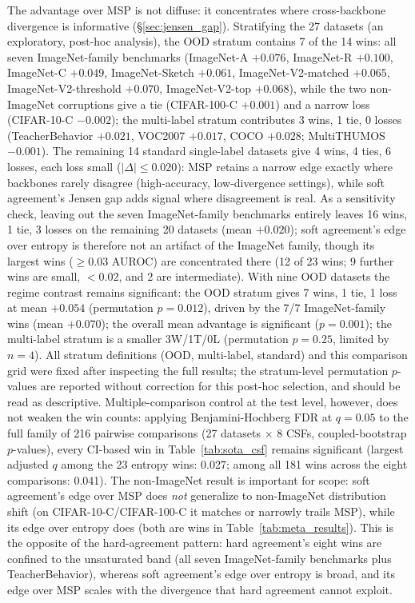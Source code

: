\documentclass[a4paper,fleqn]{cas-sc}
\begin{document}
The advantage over MSP is not diffuse: it concentrates where cross-backbone divergence is informative (\S\ref{sec:jensen_gap}).
Stratifying the 27 datasets (an exploratory, post-hoc analysis), the OOD stratum contains 7 of the 14 wins: all seven ImageNet-family benchmarks (ImageNet-A $+0.076$, ImageNet-R $+0.100$, ImageNet-C $+0.049$, ImageNet-Sketch $+0.061$, ImageNet-V2-matched $+0.065$, ImageNet-V2-threshold $+0.070$, ImageNet-V2-top $+0.068$), while the two non-ImageNet corruptions give a tie (CIFAR-100-C $+0.001$) and a narrow loss (CIFAR-10-C $-0.002$); the multi-label stratum contributes 3 wins, 1 tie, 0 losses (TeacherBehavior $+0.021$, VOC2007 $+0.017$, COCO $+0.028$; MultiTHUMOS $-0.001$).
The remaining 14 standard single-label datasets give 4 wins, 4 ties, 6 losses, each loss small ($|\Delta| \le 0.020$): MSP retains a narrow edge exactly where backbones rarely disagree (high-accuracy, low-divergence settings), while soft agreement's Jensen gap adds signal where disagreement is real.
As a sensitivity check, leaving out the seven ImageNet-family benchmarks entirely leaves 16 wins, 1 tie, 3 losses on the remaining 20 datasets (mean $+0.020$); soft agreement's edge over entropy is therefore not an artifact of the ImageNet family, though its largest wins ($\ge 0.03$ AUROC) are concentrated there (12 of 23 wins; 9 further wins are small, $< 0.02$, and 2 are intermediate).
With nine OOD datasets the regime contrast remains significant: the OOD stratum gives 7 wins, 1 tie, 1 loss at mean $+0.054$ (permutation $p = 0.012$), driven by the 7/7 ImageNet-family wins (mean $+0.070$); the overall mean advantage is significant ($p = 0.001$); the multi-label stratum is a smaller 3W/1T/0L (permutation $p = 0.25$, limited by $n{=}4$).
All stratum definitions (OOD, multi-label, standard) and this comparison grid were fixed after inspecting the full results; the stratum-level permutation $p$-values are reported without correction for this post-hoc selection, and should be read as descriptive.
Multiple-comparison control at the test level, however, does not weaken the win counts: applying Benjamini-Hochberg FDR at $q{=}0.05$ to the full family of 216 pairwise comparisons (27 datasets $\times$ 8 CSFs, coupled-bootstrap $p$-values), every CI-based win in Table~\ref{tab:sota_csf} remains significant (largest adjusted $q$ among the 23 entropy wins: 0.027; among all 181 wins across the eight comparisons: 0.041).
The non-ImageNet result is important for scope: soft agreement's edge over MSP does \emph{not} generalize to non-ImageNet distribution shift (on CIFAR-10-C/CIFAR-100-C it matches or narrowly trails MSP), while its edge over entropy does (both are wins in Table~\ref{tab:meta_results}).
This is the opposite of the hard-agreement pattern: hard agreement's eight wins are confined to the unsaturated band (all seven ImageNet-family benchmarks plus TeacherBehavior), whereas soft agreement's edge over entropy is broad, and its edge over MSP scales with the divergence that hard agreement cannot exploit.
\end{document}
